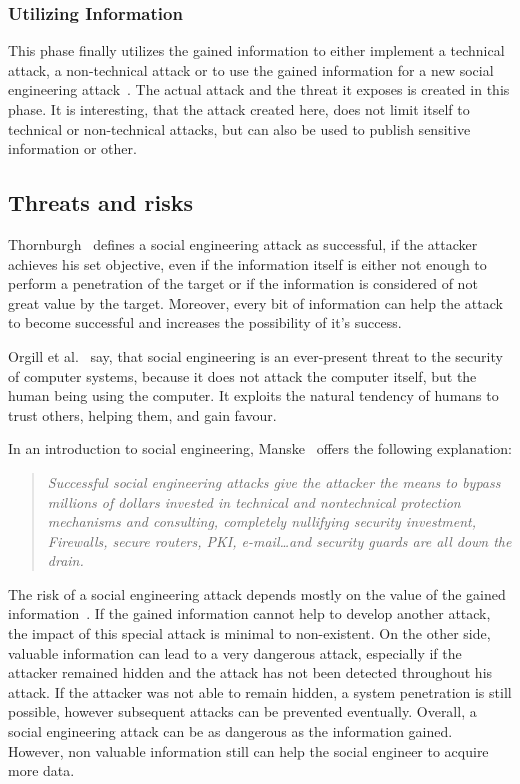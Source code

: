 \subsubsection{Utilizing Information}

This phase finally utilizes the gained information to either implement a
technical attack, a non-technical attack or to use the gained information for a
new social engineering attack~\cite{thornburgh2004}. The actual attack and the
threat it exposes is created in this phase. It is interesting, that the attack
created here, does not limit itself to technical or non-technical attacks, but
can also be used to publish sensitive information or other.

\subsection{Threats and risks}

Thornburgh~\cite{thornburgh2004} defines a social engineering attack as
successful, if the attacker achieves his set objective, even if the information itself
is either not enough to perform a penetration of the target or if the
information is considered of not great value by the target. Moreover, every
bit of information can help the attack to become successful and increases the
possibility of it's success.

Orgill et al.~\cite{orgill2004} say, that social engineering is an ever-present
threat to the security of computer systems, because it does not attack the
computer itself, but the human being using the computer. It exploits the
natural tendency of humans to trust others, helping them, and gain favour.

In an introduction to social engineering, Manske~\cite{manske2000} offers the
following explanation:

\begin{quote}
\textit{Successful social engineering attacks give the attacker the means to bypass
millions of dollars invested in technical and nontechnical protection
mechanisms and consulting, completely nullifying security investment,
Firewalls, secure routers, PKI, e-mail\dots and security guards are all down
the drain.}
\end{quote}

The risk of a social engineering attack depends mostly on the value of the
gained information~\cite{thornburgh2004}. If the gained information cannot help
to develop another attack, the impact of this special attack is minimal to
non-existent. On the other side, valuable information can lead to a very
dangerous attack, especially if the attacker remained hidden and the attack has
not been detected throughout his attack. If the attacker was not able to remain
hidden, a system penetration is still possible, however subsequent attacks can
be prevented eventually. Overall, a social engineering attack can be as dangerous
as the information gained. However, non valuable information still can help the
social engineer to acquire more data.

